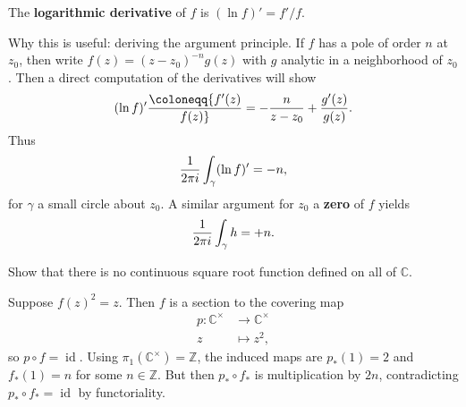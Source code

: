 \begin{definition}

The \textbf{logarithmic derivative} of \(f\) is \((\ln f)' = f'/f\).

\end{definition}

\begin{remark}

Why this is useful: deriving the argument principle. If \(f\) has a pole
of order \(n\) at \(z_0\), then write \(f(z) = (z-z_0)^{-n} g(z)\) with
\(g\) analytic in a neighborhood of \(z_0\). Then a direct computation
of the derivatives will show
\begin{align*}
(\ln f)' \coloneqq{f'(z) \over f(z)} = -{n\over z-z_0} + {g'(z) \over g(z)}
.\end{align*}
Thus
\begin{align*}
{1\over 2\pi i } \int_\gamma (\ln f)' = -n
,\end{align*}
for \(\gamma\) a small circle about \(z_0\). A similar argument for
\(z_0\) a \textbf{zero} of \(f\) yields
\begin{align*}
{1\over 2\pi i } \int_\gamma h = +n
.\end{align*}

\end{remark}

\begin{exercise}[?]

Show that there is no continuous square root function defined on all of
\({\mathbb{C}}\).

\end{exercise}

\begin{solution}

Suppose \(f(z)^2 = z\). Then \(f\) is a section to the covering map
\begin{align*}
p: {\mathbb{C}}^{\times}&\to {\mathbb{C}}^{\times}\\
z & \mapsto z^2
,\end{align*}
so \(p\circ f = \operatorname{id}\). Using
\(\pi_1({\mathbb{C}}^{\times}) = {\mathbb{Z}}\), the induced maps are
\(p_*(1) = 2\) and \(f_*(1) = n\) for some \(n\in {\mathbb{Z}}\). But
then \(p_* \circ f_*\) is multiplication by \(2n\), contradicting
\(p_* \circ f_* = \operatorname{id}\) by functoriality.

\end{solution}

